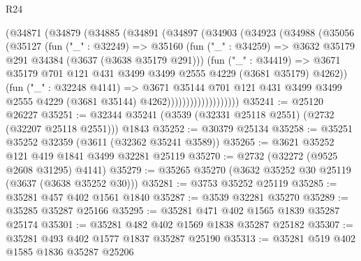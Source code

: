 \begin{lexlean}{R24}
\begin{coremodule}
                    (@34871
                      (@34879
                        (@34885
                          (@34891
                            (@34897
                              (@34903
                                (@34923
                                  (@34988
                                    (@35056
                                      (@35127
                                        (fun ("_" : @32249) =>
                                        @35160
                                          (fun ("_" : @34259) =>
                                          @3632 @35179 @291 @34384 (@3637 (@3638 @35179 @291)))
                                          (fun ("_" : @34419) =>
                                          @3671
                                            @35179
                                            @701
                                            @121
                                            @431
                                            @3499
                                            @3499
                                            @2555
                                            @4229
                                            (@3681 @35179)
                                            @4262))
                                        (fun ("_" : @32248 @4141) =>
                                        @3671
                                          @35144
                                          @701
                                          @121
                                          @431
                                          @3499
                                          @3499
                                          @2555
                                          @4229
                                          (@3681 @35144)
                                          @4262)))))))))))))))))))
@35241 := @25120 @26227
@35251 := @32344 @35241 (@3539 (@32331 @25118 @2551) (@2732 (@32207 @25118 @2551))) @1843
@35252 := @30379 @25134
@35258 := @35251 @35252 @32359 (@3611 (@32362 @35241 @3589))
@35265 := @3621 @35252 @121 @419 @1841 @3499 @32281 @25119
@35270 := @2732 (@32272 (@9525 @2608 @31295) @4141)
@35279 := @35265 @35270 (@3632 @35252 @30 @25119 (@3637 (@3638 @35252 @30)))
@35281 := @3753 @35252 @25119
@35285 := @35281 @457 @402 @1561 @1840
@35287 := @3539 @32281 @35270
@35289 := @35285 @35287 @25166
@35295 := @35281 @471 @402 @1565 @1839 @35287 @25174
@35301 := @35281 @482 @402 @1569 @1838 @35287 @25182
@35307 := @35281 @493 @402 @1577 @1837 @35287 @25190
@35313 := @35281 @519 @402 @1585 @1836 @35287 @25206

\end{coremodule}
\end{lexlean}
